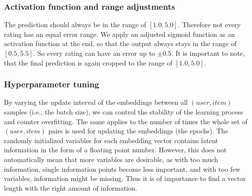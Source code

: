 \subsubsection{Activation function and range adjustments}
The prediction should always be in the range of $[1.0, 5.0]$. Therefore not every rating has an equal error range. We apply an adjusted sigmoid function as an activation function at the end, so that the output always stays in the range of $[0.5, 5.5]$. So every rating can have an error up to $\pm0.5$. It is important to note, that the final prediction is again cropped to the range of $[1.0, 5.0]$.

\subsubsection{Hyperparameter tuning}
By varying the update interval of the embeddings between all $(user, item)$ samples (i.e., the batch size), we can control the stability of the learning process and counter overfitting. The same applies to the number of times the whole set of $(user, item)$ pairs is used for updating the embeddings (the epochs). The randomly initialized variables for each embedding vector contains latent information in the form of a floating point number. However, this does not automatically mean that more variables are desirable, as with too much information, single information points become less important, and with too few variables, information might be missing. Thus it is of importance to find a vector length with the right amount of information. 